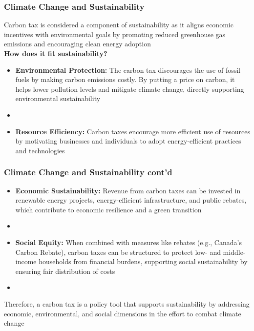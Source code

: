 \documentclass[blue]{beamer}
\begin{document}
      \begin{frame} \frametitle{Climate Change and Sustainability}
\label{GHG comparison}

Carbon tax is considered a component of sustainability as it aligns economic incentives with environmental goals by promoting reduced greenhouse gas emissions and encouraging clean energy adoption\\


\textbf{How does it fit sustainability?}
\begin{itemize}


\item \textbf{Environmental Protection:} The carbon tax discourages the use of fossil fuels by making carbon emissions costly.  By putting a price on carbon, it helps lower pollution levels and mitigate climate change, directly supporting environmental sustainability
\item[]
\item \textbf{Resource Efficiency:} Carbon taxes encourage more efficient use of resources by motivating businesses and individuals to adopt energy-efficient practices and technologies
\end{itemize}
 \end{frame}



      \begin{frame} \frametitle{Climate Change and Sustainability cont'd}
\label{GHG comparison}

\begin{itemize}


\item \textbf{Economic Sustainability:} Revenue from carbon taxes can be invested in renewable energy projects, energy-efficient infrastructure, and public rebates, which contribute to economic resilience and a green transition
\item[]
\item \textbf{Social Equity:} When combined with measures like rebates (e.g., Canada's Carbon Rebate), carbon taxes can be structured to protect low- and middle-income households from financial burdens, supporting social sustainability by ensuring fair distribution of costs
\item[]
\end{itemize}
Therefore,  a carbon tax is a policy tool that supports sustainability by addressing economic, environmental, and social dimensions in the effort to combat climate change
 \end{frame}
\end{document}
